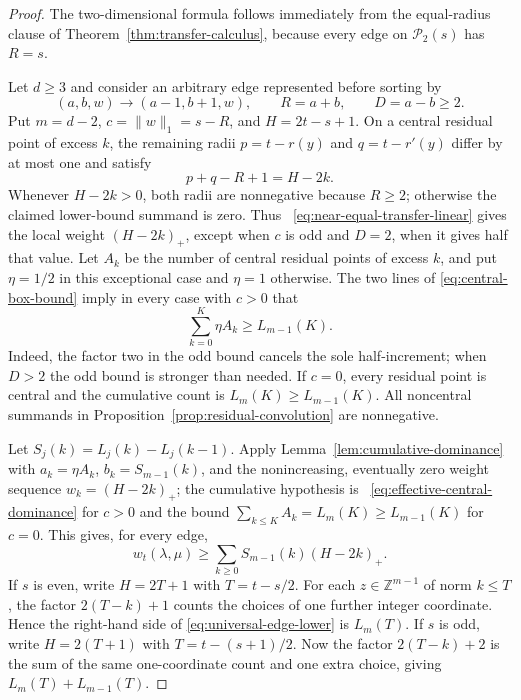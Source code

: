 \documentclass[pdflatex,sn-mathphys-num]{sn-jnl}
\theoremstyle{thmstyleone}
\theoremstyle{thmstylethree}
\theoremstyle{thmstyletwo}
\newcommand{\Z}{\mathbb Z}
\begin{document}
\begin{proof}
The two-dimensional formula follows immediately from the equal-radius clause
of Theorem~\ref{thm:transfer-calculus}, because every edge on
$\mathcal P_2(s)$ has $R=s$.

Let $d\ge3$ and consider an arbitrary edge represented before sorting by
\[
 (a,b,w)\longrightarrow(a-1,b+1,w),\qquad
 R=a+b,\qquad D=a-b\ge2.
\]
Put $m=d-2$, $c=\|w\|_1=s-R$, and $H=2t-s+1$.  On a central residual point of
excess $k$, the remaining radii $p=t-r(y)$ and $q=t-r'(y)$ differ by at most
one and satisfy
\begin{equation}
 p+q-R+1=H-2k.                                        \label{eq:central-gain}
\end{equation}
Whenever $H-2k>0$, both radii are nonnegative because $R\ge2$; otherwise the
claimed lower-bound summand is zero.  Thus
~\eqref{eq:near-equal-transfer-linear} gives the local weight
$(H-2k)_+$, except when $c$ is odd and $D=2$, when it gives half that value.
Let $A_k$ be the number of central residual points of excess $k$, and put
$\eta=1/2$ in this exceptional case and $\eta=1$ otherwise.  The two lines of
\eqref{eq:central-box-bound} imply in every case with $c>0$ that
\begin{equation}
 \sum_{k=0}^K\eta A_k\ge L_{m-1}(K).                  \label{eq:effective-central-dominance}
\end{equation}
Indeed, the factor two in the odd bound cancels the sole half-increment; when
$D>2$ the odd bound is stronger than needed.  If $c=0$, every residual point
is central and the cumulative count is $L_m(K)\ge L_{m-1}(K)$.  All
noncentral summands in Proposition~\ref{prop:residual-convolution} are
nonnegative.

Let $S_j(k)=L_j(k)-L_j(k-1)$.  Apply
Lemma~\ref{lem:cumulative-dominance} with $a_k=\eta A_k$,
$b_k=S_{m-1}(k)$, and the nonincreasing, eventually zero weight sequence
$w_k=(H-2k)_+$; the cumulative hypothesis is
~\eqref{eq:effective-central-dominance} for $c>0$ and the bound
$\sum_{k\le K}A_k=L_m(K)\ge L_{m-1}(K)$ for $c=0$.  This gives, for every
edge,
\begin{equation}
 w_t(\lambda,\mu)
 \ge \sum_{k\ge0}S_{m-1}(k)(H-2k)_+.                 \label{eq:universal-edge-lower}
\end{equation}
If $s$ is even, write $H=2T+1$ with $T=t-s/2$.  For each
$z\in\Z^{m-1}$ of norm $k\le T$, the factor $2(T-k)+1$ counts the choices of
one further integer coordinate.  Hence the right-hand side of
\eqref{eq:universal-edge-lower} is $L_m(T)$.  If $s$ is odd, write
$H=2(T+1)$ with $T=t-(s+1)/2$.  Now the factor $2(T-k)+2$ is the sum of the
same one-coordinate count and one extra choice, giving
$L_m(T)+L_{m-1}(T)$.


\end{proof}
\end{document}
